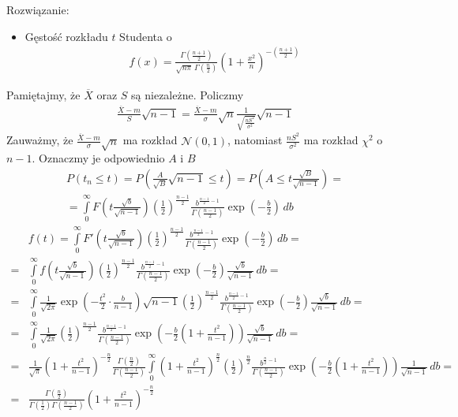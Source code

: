 Rozwiązanie:
\begin{itemize}
\item Gęstość rozkładu $ t $ Studenta o 
\begin{gather*}
f(x)=\frac{\Gamma(\frac{n+1}{2})} {\sqrt{n\pi}\,\Gamma(\frac{n}{2})} \left(1+\frac{x^2}{n} \right)^{-\left(\frac{n+1}{2}\right)}
\end{gather*}
\end{itemize}
Pamiętajmy, że $ \overline X $ oraz $ S $ są niezależne.
Policzmy
\begin{gather*}
\frac{\overline X-m}{S}\sqrt{n-1}=
\frac{\overline X-m}{\sigma}\sqrt n
\frac{1}{\sqrt{\frac{nS^2}{\sigma^2}}}\sqrt{n-1}
\end{gather*}
Zauważmy, że $ \frac{\overline X-m}{\sigma}\sqrt n $ ma rozkład $ \mathcal N(0,1) $, natomiast $ \frac{nS^2}{\sigma^2} $ ma rozkład $ \chi^2 $ o $ n-1 $. Oznaczmy je odpowiednio $ A $ i $ B $
\begin{gather*}
P\left(t_n\le t\right)=
P\left(\frac{A}{\sqrt B}\sqrt{n-1}\le t\right)=
P\left(A\le t\frac{\sqrt B}{\sqrt{n-1}}\right)
=\\=
\int\limits_{0}^{\infty }F\left(t\frac{\sqrt b}{\sqrt{n-1}}\right)
\left(\frac{1}{2}\right)^{\frac{n-1}{2}}\frac{b^{\frac{n-1}{2}-1}}{\Gamma\left(\frac{n-1}{2}\right)} \exp\left(-\frac{b}{2}\right)\,db
\end{gather*}
\begin{align*}
&f(t)=
\int\limits_{0}^{\infty }
F'\left(t\frac{\sqrt b}{\sqrt{n-1}}\right)
\left(\frac{1}{2}\right)^{\frac{n-1}{2}}
\frac{b^{\frac{n-1}{2}-1}}{\Gamma\left(\frac{n-1}{2}\right)}
\exp\left(-\frac{b}{2}\right)\,db
=\\=&
\int\limits_{0}^{\infty }
f\left(t\frac{\sqrt b}{\sqrt{n-1}}\right)
\left(\frac{1}{2}\right)^{\frac{n-1}{2}}
\frac{b^{\frac{n-1}{2}-1}}{\Gamma\left(\frac{n-1}{2}\right)}
\exp\left(-\frac{b}{2}\right)
\frac{\sqrt b}{\sqrt{n-1}}\,db
=\\=&
\int\limits_{0}^{\infty }
\frac{1}{\sqrt{2\pi}}\exp\left(-\frac{t^2}{2}\cdot \frac{b}{n-1}\right){\sqrt{n-1}}
\left(\frac{1}{2}\right)^{\frac{n-1}{2}}
\frac{b^{\frac{n-1}{2}-1}}{\Gamma\left(\frac{n-1}{2}\right)}
\exp\left(-\frac{b}{2}\right)
\frac{\sqrt b}{\sqrt{n-1}}\,db
=\\=&
\int\limits_{0}^{\infty }
\frac{1}{\sqrt{2\pi}}
\left(\frac{1}{2}\right)^{\frac{n-1}{2}}
\frac{b^{\frac{n-1}{2}-1}}{\Gamma\left(\frac{n-1}{2}\right)}
\exp\left(-\frac{b}{2}\left(1+\frac{t^2}{n-1}\right)\right)
\frac{\sqrt b}{\sqrt{n-1}}\,db
=\\=&
\frac{1}{\sqrt{\pi}}
\left(1+\frac{t^2}{n-1}\right)^{-\frac{n}{2}}\frac{\Gamma(\frac{n}{2})}{\Gamma\left(\frac{n-1}{2}\right)}
\int\limits_{0}^{\infty }
\left(1+\frac{t^2}{n-1}\right)^{\frac{n}{2}}
\left(\frac{1}{2}\right)^{\frac{n}{2}}
\frac{b^{\frac{n}{2}-1}}{\Gamma\left(\frac{n-1}{2}\right)}
\exp\left(-\frac{b}{2}\left(1+\frac{t^2}{n-1}\right)\right)
\frac{1}{\sqrt{n-1}}\,db
=\\=&
\frac{\Gamma\left(\frac{n}{2}\right)}{\Gamma\left(\frac{1}{2}\right)\Gamma\left(\frac{n-1}{2}\right)}
\left(1+\frac{t^2}{n-1}\right)^{-\frac{n}{2}}
\end{align*}